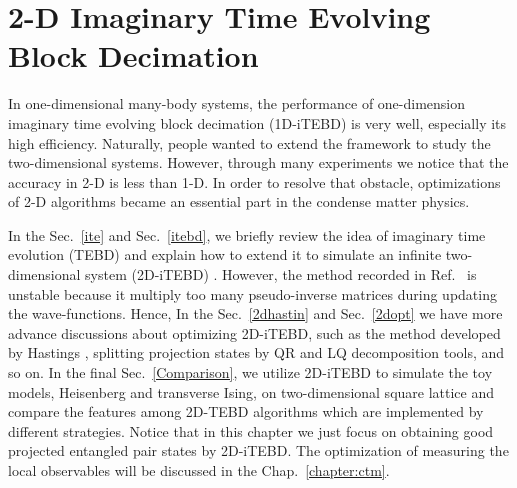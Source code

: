 \chapter{2-D Imaginary Time Evolving Block Decimation}
\label{chapter:2ditebd}

In one-dimensional many-body systems, the performance of one-dimension imaginary time evolving block decimation (1D-iTEBD) is very well, especially its high efficiency. Naturally, people wanted to extend the framework to study the two-dimensional systems. However, through many experiments we notice that the accuracy in 2-D is less than 1-D. In order to resolve that obstacle, optimizations of 2-D algorithms became an essential part in the condense matter physics. 

In the Sec.~\ref{ite} and Sec.~\ref{itebd}, we briefly review the idea of imaginary time evolution (TEBD) \cite{PhysRevLett.93.040502} \cite{PhysRevB.78.155117} and explain how to extend it to simulate an infinite two-dimensional system (2D-iTEBD) \cite{PhysRevB.86.195137}. However, the method recorded in Ref.~\cite{PhysRevB.86.195137} is unstable because it multiply too many pseudo-inverse matrices during updating the wave-functions. Hence, In the Sec.~\ref{2dhastin} and Sec.~\ref{2dopt} we have more advance discussions about optimizing 2D-iTEBD, such as the method developed by Hastings \cite{light_hastings}, splitting projection states by QR and LQ decomposition tools, and so on. In the final Sec.~\ref{Comparison}, we utilize 2D-iTEBD to simulate the toy models, Heisenberg and transverse Ising, on two-dimensional square lattice and compare the features among 2D-TEBD algorithms which are implemented by different strategies. Notice that in this chapter we just focus on obtaining good projected entangled pair states \cite{PhysRevA.75.033605} by 2D-iTEBD. The optimization of measuring the local observables will be discussed in the Chap.~\ref{chapter:ctm}.

